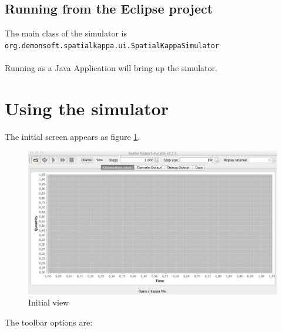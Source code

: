 \documentclass[english]{report}
\begin{document}
\subsection{Running from the Eclipse project}

The main class of the simulator is \\
\verb|org.demonsoft.spatialkappa.ui.SpatialKappaSimulator|\\\\
Running as a Java Application will bring up the simulator.


\section{Using the simulator}

The initial screen appears as figure \ref{fig:startup}.

\begin{figure}[h!]
 \centering
 \includegraphics[scale=0.45]{./images/startup2.png}
 \caption{Initial view}
 \label{fig:startup}
\end{figure}

The toolbar options are:
\end{document}
